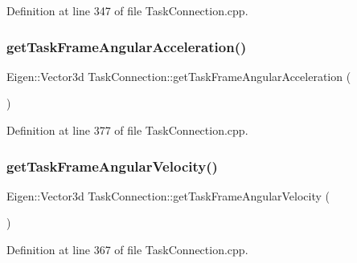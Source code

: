 Definition at line 347 of file Task\+Connection.\+cpp.

\hypertarget{classocra__recipes_1_1TaskConnection_abae3e5305e8de9be7ccf34fdbb4d6e1a}{}\label{classocra__recipes_1_1TaskConnection_abae3e5305e8de9be7ccf34fdbb4d6e1a} 
\subsubsection{\texorpdfstring{get\+Task\+Frame\+Angular\+Acceleration()}{getTaskFrameAngularAcceleration()}}
{\footnotesize\ttfamily Eigen\+::\+Vector3d Task\+Connection\+::get\+Task\+Frame\+Angular\+Acceleration (\begin{DoxyParamCaption}{ }\end{DoxyParamCaption})}



Definition at line 377 of file Task\+Connection.\+cpp.

\hypertarget{classocra__recipes_1_1TaskConnection_a57f6e6e29aa2d09bff7c9aa7e7a322f7}{}\label{classocra__recipes_1_1TaskConnection_a57f6e6e29aa2d09bff7c9aa7e7a322f7} 
\subsubsection{\texorpdfstring{get\+Task\+Frame\+Angular\+Velocity()}{getTaskFrameAngularVelocity()}}
{\footnotesize\ttfamily Eigen\+::\+Vector3d Task\+Connection\+::get\+Task\+Frame\+Angular\+Velocity (\begin{DoxyParamCaption}{ }\end{DoxyParamCaption})}



Definition at line 367 of file Task\+Connection.\+cpp.

\hypertarget{classocra__recipes_1_1TaskConnection_a4595bb517cd965bc9f08f609e3e15e78}{}\label{classocra__recipes_1_1TaskConnection_a4595bb517cd965bc9f08f609e3e15e78} 
